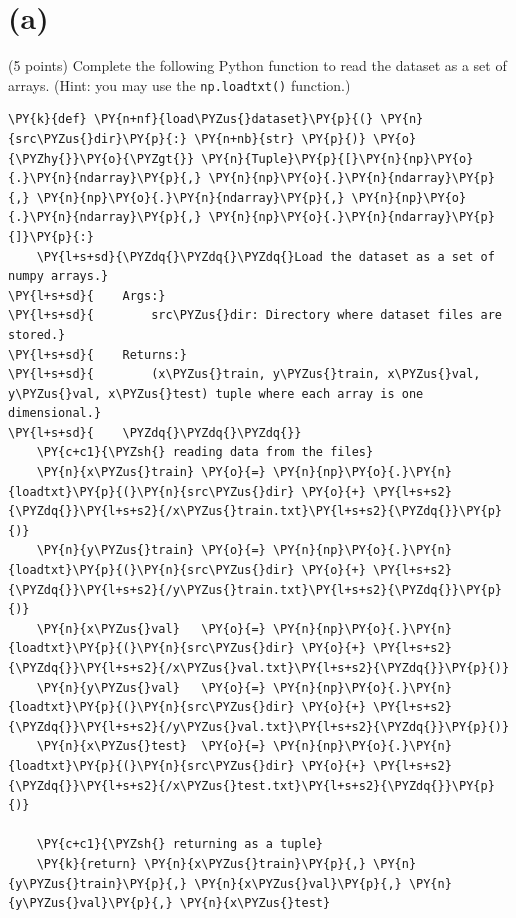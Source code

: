 \documentclass[a4paper,11pt]{article}%
\begin{document}
    \hypertarget{a}{%
\section{(a)}\label{a}}

(5 points) Complete the following Python function to read the dataset as
a set of arrays. (Hint: you may use the \texttt{np.loadtxt()} function.)

    \begin{tcolorbox}[breakable, size=fbox, boxrule=1pt, pad at break*=1mm,colback=cellbackground, colframe=cellborder]
\begin{Verbatim}[commandchars=\\\{\}]
\PY{k}{def} \PY{n+nf}{load\PYZus{}dataset}\PY{p}{(} \PY{n}{src\PYZus{}dir}\PY{p}{:} \PY{n+nb}{str} \PY{p}{)} \PY{o}{\PYZhy{}}\PY{o}{\PYZgt{}} \PY{n}{Tuple}\PY{p}{[}\PY{n}{np}\PY{o}{.}\PY{n}{ndarray}\PY{p}{,} \PY{n}{np}\PY{o}{.}\PY{n}{ndarray}\PY{p}{,} \PY{n}{np}\PY{o}{.}\PY{n}{ndarray}\PY{p}{,} \PY{n}{np}\PY{o}{.}\PY{n}{ndarray}\PY{p}{,} \PY{n}{np}\PY{o}{.}\PY{n}{ndarray}\PY{p}{]}\PY{p}{:}
    \PY{l+s+sd}{\PYZdq{}\PYZdq{}\PYZdq{}Load the dataset as a set of numpy arrays.}
\PY{l+s+sd}{    Args:}
\PY{l+s+sd}{        src\PYZus{}dir: Directory where dataset files are stored.}
\PY{l+s+sd}{    Returns:}
\PY{l+s+sd}{        (x\PYZus{}train, y\PYZus{}train, x\PYZus{}val, y\PYZus{}val, x\PYZus{}test) tuple where each array is one dimensional.}
\PY{l+s+sd}{    \PYZdq{}\PYZdq{}\PYZdq{}}
    \PY{c+c1}{\PYZsh{} reading data from the files}
    \PY{n}{x\PYZus{}train} \PY{o}{=} \PY{n}{np}\PY{o}{.}\PY{n}{loadtxt}\PY{p}{(}\PY{n}{src\PYZus{}dir} \PY{o}{+} \PY{l+s+s2}{\PYZdq{}}\PY{l+s+s2}{/x\PYZus{}train.txt}\PY{l+s+s2}{\PYZdq{}}\PY{p}{)}
    \PY{n}{y\PYZus{}train} \PY{o}{=} \PY{n}{np}\PY{o}{.}\PY{n}{loadtxt}\PY{p}{(}\PY{n}{src\PYZus{}dir} \PY{o}{+} \PY{l+s+s2}{\PYZdq{}}\PY{l+s+s2}{/y\PYZus{}train.txt}\PY{l+s+s2}{\PYZdq{}}\PY{p}{)}
    \PY{n}{x\PYZus{}val}   \PY{o}{=} \PY{n}{np}\PY{o}{.}\PY{n}{loadtxt}\PY{p}{(}\PY{n}{src\PYZus{}dir} \PY{o}{+} \PY{l+s+s2}{\PYZdq{}}\PY{l+s+s2}{/x\PYZus{}val.txt}\PY{l+s+s2}{\PYZdq{}}\PY{p}{)}
    \PY{n}{y\PYZus{}val}   \PY{o}{=} \PY{n}{np}\PY{o}{.}\PY{n}{loadtxt}\PY{p}{(}\PY{n}{src\PYZus{}dir} \PY{o}{+} \PY{l+s+s2}{\PYZdq{}}\PY{l+s+s2}{/y\PYZus{}val.txt}\PY{l+s+s2}{\PYZdq{}}\PY{p}{)}
    \PY{n}{x\PYZus{}test}  \PY{o}{=} \PY{n}{np}\PY{o}{.}\PY{n}{loadtxt}\PY{p}{(}\PY{n}{src\PYZus{}dir} \PY{o}{+} \PY{l+s+s2}{\PYZdq{}}\PY{l+s+s2}{/x\PYZus{}test.txt}\PY{l+s+s2}{\PYZdq{}}\PY{p}{)}
    
    \PY{c+c1}{\PYZsh{} returning as a tuple}
    \PY{k}{return} \PY{n}{x\PYZus{}train}\PY{p}{,} \PY{n}{y\PYZus{}train}\PY{p}{,} \PY{n}{x\PYZus{}val}\PY{p}{,} \PY{n}{y\PYZus{}val}\PY{p}{,} \PY{n}{x\PYZus{}test}
\end{Verbatim}
\end{tcolorbox}
\end{document}
